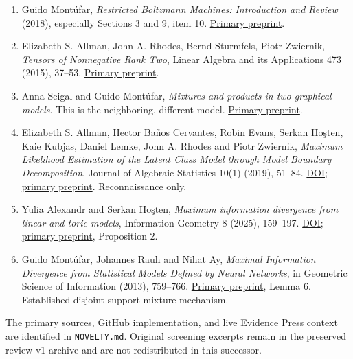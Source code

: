 \begin{enumerate}
\def\labelenumi{\arabic{enumi}.}
\tightlist
\item
  Guido Montúfar, \emph{Restricted Boltzmann Machines: Introduction and
  Review} (2018), especially Sections 3 and 9, item 10.
  \href{https://arxiv.org/abs/1806.07066}{Primary preprint}.
\item
  Elizabeth S. Allman, John A. Rhodes, Bernd Sturmfels, Piotr Zwiernik,
  \emph{Tensors of Nonnegative Rank Two}, Linear Algebra and its
  Applications 473 (2015), 37--53.
  \href{https://arxiv.org/abs/1305.0539}{Primary preprint}.
\item
  Anna Seigal and Guido Montúfar, \emph{Mixtures and products in two
  graphical models}. This is the neighboring, different model.
  \href{https://arxiv.org/abs/1709.05276}{Primary preprint}.
\item
  Elizabeth S. Allman, Hector Baños Cervantes, Robin Evans, Serkan
  Hoşten, Kaie Kubjas, Daniel Lemke, John A. Rhodes and Piotr Zwiernik,
  \emph{Maximum Likelihood Estimation of the Latent Class Model through
  Model Boundary Decomposition}, Journal of Algebraic Statistics 10(1)
  (2019), 51--84. \href{https://doi.org/10.18409/jas.v10i1.75}{DOI};
  \href{https://arxiv.org/abs/1710.01696}{primary preprint}.
  Reconnaissance only.
\item
  Yulia Alexandr and Serkan Hoşten, \emph{Maximum information divergence
  from linear and toric models}, Information Geometry 8 (2025),
  159--197. \href{https://doi.org/10.1007/s41884-025-00166-3}{DOI};
  \href{https://arxiv.org/abs/2308.15598}{primary preprint}, Proposition
  2.
\item
  Guido Montúfar, Johannes Rauh and Nihat Ay, \emph{Maximal Information
  Divergence from Statistical Models Defined by Neural Networks}, in
  Geometric Science of Information (2013), 759--766.
  \href{https://arxiv.org/abs/1303.0268}{Primary preprint}, Lemma 6.
  Established disjoint-support mixture mechanism.
\end{enumerate}

The primary sources, GitHub implementation, and live Evidence Press
context are identified in \texttt{NOVELTY.md}. Original screening
excerpts remain in the preserved review-v1 archive and are not
redistributed in this successor.
